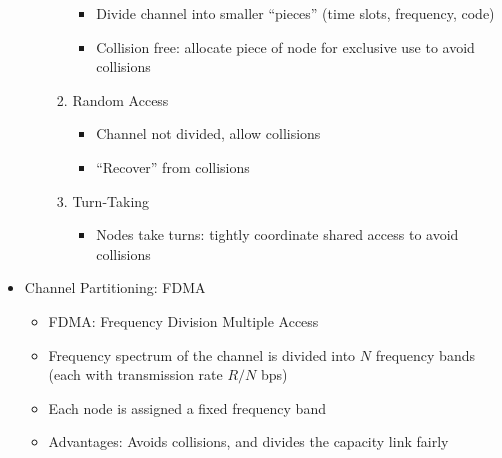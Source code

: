 \begin{itemize}
\begin{itemize}
\begin{enumerate}
            \begin{itemize}

              \item Divide channel into smaller ``pieces'' (time slots, frequency, code)

              \item Collision free: allocate piece of node for exclusive use to avoid collisions

            \end{itemize}

          \item Random Access

            \begin{itemize}

              \item Channel not divided, allow collisions

              \item ``Recover'' from collisions

            \end{itemize}

          \item Turn-Taking

            \begin{itemize}

              \item Nodes take turns: tightly coordinate shared access to avoid collisions

            \end{itemize}

        \end{enumerate}

    \end{itemize}

  \item Channel Partitioning: FDMA

    \begin{itemize}

      \item FDMA: Frequency Division Multiple Access

      \item Frequency spectrum of the channel is divided into $N$ frequency bands (each with transmission rate $R/N$ bps)

      \item Each node is assigned a fixed frequency band

      \item Advantages: Avoids collisions, and divides the capacity link fairly


\end{itemize}
\end{itemize}
